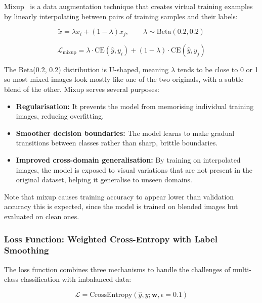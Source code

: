 \documentclass[12pt, a4paper]{article}
\begin{document}
Mixup~\cite{zhang2018mixup} is a data augmentation technique that creates
virtual training examples by linearly interpolating between pairs of training
samples and their labels:

\begin{equation}
\tilde{x} = \lambda x_i + (1 - \lambda) x_j, \qquad
\lambda \sim \text{Beta}(0.2, 0.2)
\end{equation}

\begin{equation}
\mathcal{L}_{\text{mixup}} = \lambda \cdot \text{CE}(\hat{y}, y_i) +
(1 - \lambda) \cdot \text{CE}(\hat{y}, y_j)
\end{equation}

The Beta(0.2, 0.2) distribution is U-shaped, meaning $\lambda$ tends to be
close to 0 or 1 so most mixed images look mostly like one of the two
originals, with a subtle blend of the other.  Mixup serves several purposes:
\begin{itemize}[leftmargin=*]
    \item \textbf{Regularisation:} It prevents the model from memorising
          individual training images, reducing overfitting.
    \item \textbf{Smoother decision boundaries:} The model learns to make
          gradual transitions between classes rather than sharp, brittle boundaries.
    \item \textbf{Improved cross-domain generalisation:} By training on
          interpolated images, the model is exposed to visual variations that
          are not present in the original dataset, helping it generalise to
          unseen domains.
\end{itemize}

Note that mixup causes training accuracy to appear lower than validation
accuracy this is expected, since the model is trained on blended images but
evaluated on clean ones.

\subsubsection{Loss Function: Weighted Cross-Entropy with Label Smoothing}

The loss function combines three mechanisms to handle the challenges of
multi-class classification with imbalanced data:

\begin{equation}
\mathcal{L} = \text{CrossEntropy}(\hat{y}, y; \mathbf{w}, \epsilon=0.1)
\end{equation}
\end{document}
